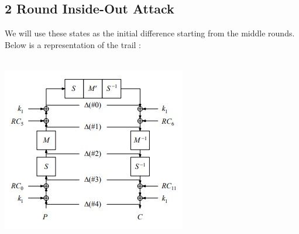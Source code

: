 \documentclass{transcrypto}
\begin{document}
\subsection{2 Round Inside-Out Attack}
We will use these states as the initial difference starting from the middle rounds. \\
Below is a representation of the trail : \\ \\
\begin{center}
\includegraphics[scale=0.75]{DC.JPG} \\ \\
\end{center}
\end{document}
